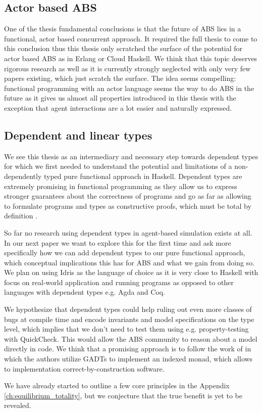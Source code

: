 \subsection{Actor based ABS}
One of the thesis fundamental conclusions is that the future of ABS lies in a functional, actor based concurrent approach. It required the full thesis to come to this conclusion thus this thesis only scratched the surface of the potential for actor based ABS as in Erlang or Cloud Haskell. We think that this topic deserves rigorous research as well as it is currently strongly neglected with only very few papers existing, which just scratch the surface. The idea seems compelling: functional programming with an actor language seems the way to do ABS in the future as it gives us almost all properties introduced in this thesis with the exception that agent interactions are a lot easier and naturally expressed.

\subsection{Dependent and linear types}
We see this thesis as an intermediary and necessary step towards dependent types for which we first needed to understand the potential and limitations of a non-dependently typed pure functional approach in Haskell. Dependent types are extremely promising in functional programming as they allow us to express stronger guarantees about the correctness of programs and go as far as allowing to formulate programs and types as constructive proofs, which must be total by definition \cite{thompson_type_1991, mckinna_why_2006, altenkirch_pi_2010}.

So far no research using dependent types in agent-based simulation exists at all. In our next paper we want to explore this for the first time and ask more specifically how we can add dependent types to our pure functional approach, which conceptual implications this has for ABS and what we gain from doing so. We plan on using Idris \cite{brady_idris_2013} as the language of choice as it is very close to Haskell with focus on real-world application and running programs as opposed to other languages with dependent types e.g. Agda and Coq.

We hypothesize that dependent types could help ruling out even more classes of bugs at compile time and encode invariants and model specifications on the type level, which implies that we don't need to test them using e.g. property-testing with QuickCheck. This would allow the ABS community to reason about a model directly in code. We think that a promising approach is to follow the work of \cite{brady_programming_2013, fowler_dependent_2014, brady_state_2016} in which the authors utilize GADTs to implement an indexed monad, which allows to implementation correct-by-construction software.

We have already started to outline a few core principles in the Appendix \ref{ch:equilibrium_totality}, but we conjecture that the true benefit is yet to be revealed.